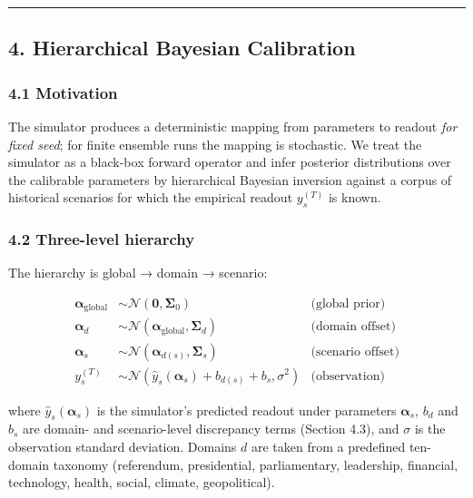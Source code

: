 \documentclass[
]{article}
\begin{document}
\begin{center}\rule{0.5\linewidth}{0.5pt}\end{center}

\subsection{4. Hierarchical Bayesian
Calibration}\label{hierarchical-bayesian-calibration}

\subsubsection{4.1 Motivation}\label{motivation}

The simulator produces a deterministic mapping from parameters to
readout \emph{for fixed seed}; for finite ensemble runs the mapping is
stochastic. We treat the simulator as a black-box forward operator and
infer posterior distributions over the calibrable parameters by
hierarchical Bayesian inversion against a corpus of historical scenarios
for which the empirical readout \(y^{(T)}_s\) is known.

\subsubsection{4.2 Three-level hierarchy}\label{three-level-hierarchy}

The hierarchy is global → domain → scenario:

\[
\begin{aligned}
\boldsymbol{\alpha}_{\text{global}} &\sim \mathcal{N}(\mathbf{0}, \boldsymbol{\Sigma}_0) & \text{(global prior)} \\
\boldsymbol{\alpha}_d &\sim \mathcal{N}(\boldsymbol{\alpha}_{\text{global}}, \boldsymbol{\Sigma}_d) & \text{(domain offset)} \\
\boldsymbol{\alpha}_s &\sim \mathcal{N}(\boldsymbol{\alpha}_{d(s)}, \boldsymbol{\Sigma}_s) & \text{(scenario offset)} \\
y^{(T)}_s &\sim \mathcal{N}(\hat{y}_s(\boldsymbol{\alpha}_s) + b_{d(s)} + b_s, \sigma^2) & \text{(observation)}
\end{aligned}
\]

where \(\hat{y}_s(\boldsymbol{\alpha}_s)\) is the simulator's predicted
readout under parameters \(\boldsymbol{\alpha}_s\), \(b_d\) and \(b_s\)
are domain- and scenario-level discrepancy terms (Section 4.3), and
\(\sigma\) is the observation standard deviation. Domains \(d\) are
taken from a predefined ten-domain taxonomy (referendum, presidential,
parliamentary, leadership, financial, technology, health, social,
climate, geopolitical).
\end{document}

